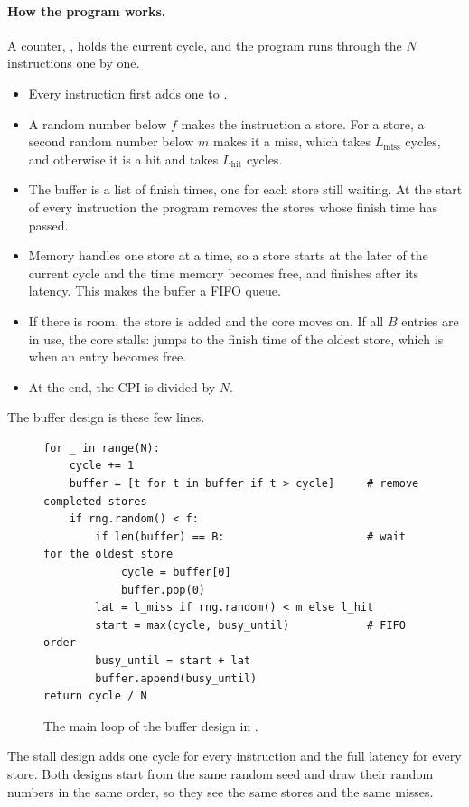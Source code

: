 \paragraph{How the program works.} A counter, , holds the current cycle, and the program runs through the $N$ instructions one by one.
\begin{itemize}
\item Every instruction first adds one to .
\item A random number below $f$ makes the instruction a store. For a store, a second random number below $m$ makes it a miss, which takes $L_{\text{miss}}$ cycles, and otherwise it is a hit and takes $L_{\text{hit}}$ cycles.
\item The buffer is a list of finish times, one for each store still waiting. At the start of every instruction the program removes the stores whose finish time has passed.
\item Memory handles one store at a time, so a store starts at the later of the current cycle and the time memory becomes free, and finishes after its latency. This makes the buffer a FIFO queue.
\item If there is room, the store is added and the core moves on. If all $B$ entries are in use, the core stalls:  jumps to the finish time of the oldest store, which is when an entry becomes free.
\item At the end, the CPI is  divided by $N$.
\end{itemize}

The buffer design is these few lines.

\begin{figure}[!htbp]
\centering
\begin{lstlisting}[style=vspython]
for _ in range(N):
    cycle += 1
    buffer = [t for t in buffer if t > cycle]     # remove completed stores
    if rng.random() < f:
        if len(buffer) == B:                      # wait for the oldest store
            cycle = buffer[0]
            buffer.pop(0)
        lat = l_miss if rng.random() < m else l_hit
        start = max(cycle, busy_until)            # FIFO order
        busy_until = start + lat
        buffer.append(busy_until)
return cycle / N
\end{lstlisting}
\caption{The main loop of the buffer design in .}
\label{fig:cpiloop}
\end{figure}

The stall design adds one cycle for every instruction and the full latency for every store. Both designs start from the same random seed and draw their random numbers in the same order, so they see the same stores and the same misses.

